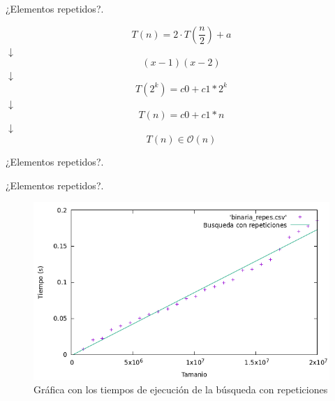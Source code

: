 \documentclass[10pt, xcolor=table]{beamer}
\begin{document}
\begin{frame}[fragile]{¿Elementos repetidos?. }
	
\[
T(n) = 2 \cdot T \left( \frac{n}{2} \right) + a
\]
\centering $\downarrow$
\[
(x-1)(x-2)
\]
\centering $\downarrow$
\[
T(2^k) = c0 + c1*2^k
\]
\centering $\downarrow$
\[
T(n) = c0 + c1*n
\]
\centering $\downarrow$
\[
T(n) \in \mathcal{O}(n)
\]

\end{frame}


\begin{frame}[fragile]{¿Elementos repetidos?. }
	\begin{table}[h!]
		\centering
		\footnotesize
		\caption{Experiencia empírica de la búsqueda con repeticiones}
	\end{table}
\end{frame}

\begin{frame}[fragile]{¿Elementos repetidos?. }
	\begin{figure}[h!]
		\centering
		\includegraphics[scale=0.45]{./Images/Grafica_binaria_repes.png}
		\caption{Gráfica con los tiempos de ejecución de la búsqueda con repeticiones}
	\end{figure}
\end{frame}
\end{document}
